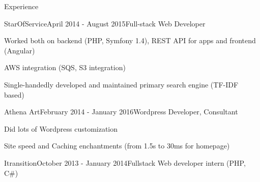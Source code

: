 \documentclass{resume} %
\begin{document}
\begin{rSection}{Experience}
\clearpage


\begin{rSubsection}{StarOfService}{April 2014 - August 2015}{Full-stack Web Developer}{}
\item Worked both on backend (PHP, Symfony 1.4), REST API for apps and frontend (Angular)
\item AWS integration (SQS, S3 integration)
\item Single-handedly developed and maintained primary search engine (TF-IDF based)
\end{rSubsection}


\begin{rSubsection}{Athena Art}{February 2014 - January 2016}{Wordpress Developer, Consultant}{}
\item Did lots of Wordpress customization
\item Site speed and Caching enchantments (from 1.5s to 30ms for homepage)
\end{rSubsection}

\begin{rSubsection}{Itransition}{October 2013 - January 2014}{Fullstack Web developer intern (PHP, C\#)}{}
\end{rSubsection}


%
%
%
%
%
%
\end{rSection}
\end{document}
